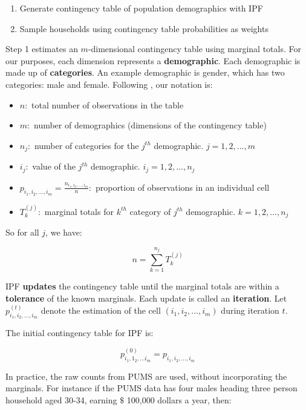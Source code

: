 \documentclass{article}
\begin{document}
		\begin{enumerate}
			\item Generate contingency table of population demographics with IPF
			\item Sample households using contingency table probabilities as weights
		\end{enumerate}

		Step 1 estimates an $m$-dimensional contingency table using marginal totals. For our purposes, each dimension represents a \textbf{demographic}. Each demographic is made up of \textbf{categories}. An example demographic is gender, which has two categories: male and female. Following \cite{beckman1996creating}, our notation is:

		\begin{itemize}
			\item $n: $ total number of observations in the table
			\item $m: $ number of demographics (dimensions of the contingency table)
			\item $n_j: $ number of categories for the $j^{th}$ demographic. $j = 1, 2, ..., m$
			\item $i_j: $ value of the $j^{th}$ demographic. $i_j = 1, 2, ..., n_j$ 
			\item $p_{i_1, i_2, ..., i_m} = \frac{n_{i_1, i_2, ..., i_m}}{n}: $ proportion of observations in an individual cell
			\item $T_k^{(j)}: $ marginal totals for $k^{th}$ category of $j^{th}$ demographic. $k = 1, 2, ..., n_j$
		\end{itemize}

		So for all $j$, we have:

		\begin{equation}
			n = \sum_{k = 1}^{n_j} T_k^{(j)}
		\end{equation}

		IPF \textbf{updates} the contingency table until the marginal totals are within a \textbf{tolerance} of the known marginals. Each update is called an \textbf{iteration}. Let $p_{i_1, i_2, ..., i_m}^{(t)}$ denote the estimation of the cell $(i_1, i_2, ..., i_m)$ during iteration $t$.

		The initial contingency table for IPF is:

		\begin{equation}
			p_{i_1, 1_2, ...i_m}^{(0)} = p_{i_1, i_2,...,	i_m}
		\end{equation}

		In practice, the raw counts from PUMS are used, without incorporating the marginals. For instance if the PUMS data has four males heading three person household aged 30-34, earning $\$$ 100,000 dollars a year, then:
\end{document}
